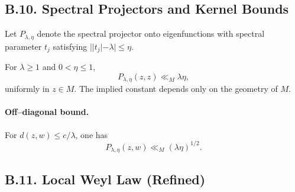 %

%
%
\subsection*{B.10. Spectral Projectors and Kernel Bounds}

Let $P_{\lambda,\eta}$ denote the spectral projector onto eigenfunctions with
spectral parameter $t_j$ satisfying $||t_j|-\lambda|\le\eta$.

\begin{proposition}\label{prop:B10}
For $\lambda\ge1$ and $0<\eta\le1$,
\begin{equation}
  P_{\lambda,\eta}(z,z)\ll_{M} \lambda \eta,
\end{equation}
uniformly in $z\in M$. The implied constant depends only on the geometry of $M$.
\end{proposition}

\paragraph{Off–diagonal bound.}
For $d(z,w)\le c/\lambda$, one has
\begin{equation}
  P_{\lambda,\eta}(z,w) \ll_{M} (\lambda\eta)^{1/2}.
\end{equation}

%

%
\subsection*{B.11. Local Weyl Law (Refined)}

